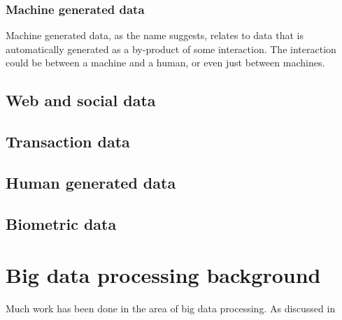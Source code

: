 \documentclass[a4paper,11pt]{article}
\begin{document}
\subsubsection{Machine generated data} %
\label{sub:machine_generated_data}

Machine generated data, as the name suggests, relates to data that is automatically generated as a by-product of some
interaction. The interaction could be between a machine and a human, or even just between machines.





\subsection{Web and social data} %
\label{sub:web_and_social_data}


\subsection{Transaction data} %
\label{sub:transaction_data}


\subsection{Human generated data} %
\label{sub:human_generated_data}


\subsection{Biometric data} %
\label{sub:biometric_data}







\section{Big data processing background} %
\label{sec:big_data_processing_background}

Much work has been done in the area of big data processing. As discussed in
\end{document}
